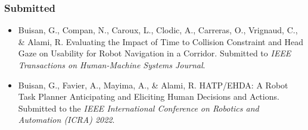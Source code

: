 \documentclass[a4paper,11pt,twoside]{StyleThese}
\begin{document}
\subsubsection*{Submitted}

\begin{itemize}
\item Buisan, G., Compan, N., Caroux, L., Clodic, A., Carreras, O., Vrignaud, C., \& Alami, R. Evaluating the Impact of Time to Collision Constraint and Head Gaze on Usability for Robot Navigation in a Corridor. Submitted to \textit{IEEE Transactions on Human-Machine Systems Journal}.

\item Buisan, G., Favier, A., Mayima, A., \& Alami, R. HATP/EHDA: A Robot Task Planner Anticipating and Eliciting Human Decisions and Actions. Submitted to the \textit{IEEE International Conference on Robotics and Automation (ICRA) 2022}.
\end{itemize}





 

\ifdefined{}
\else


\end{document}

